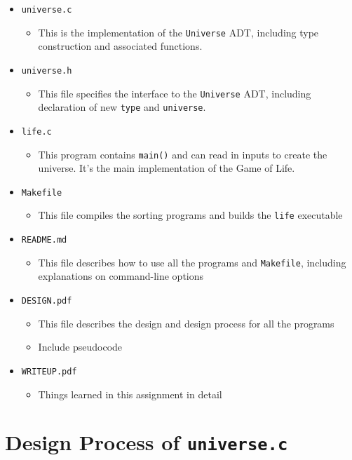 \documentclass[12pt]{article}
\begin{document}
\begin{itemize}
   \item \texttt{universe.c}
   \begin{itemize}
     \item This is the implementation of the \texttt{Universe} ADT, including type construction and associated functions.
   \end{itemize}
   \item \texttt{universe.h}
   \begin{itemize}
     \item This file specifies the interface to the \texttt{Universe} ADT, including declaration of new \texttt{type} and \texttt{universe}.
   \end{itemize}
   \item \texttt{life.c}
   \begin{itemize}
     \item This program contains \texttt{main()} and can read in inputs to create the universe. It's the main implementation of the Game of Life.
   \end{itemize}
   \item \texttt{Makefile}
   \begin{itemize}
     \item This file compiles the sorting programs and builds the \texttt{life} executable
   \end{itemize}
   \item \texttt{README.md}
   \begin{itemize}
     \item This file describes how to use all the programs and \texttt{Makefile}, including explanations on command-line options
   \end{itemize}
   \item \texttt{DESIGN.pdf}
   \begin{itemize}
     \item This file describes the design and design process for all the programs
     \item Include pseudocode
   \end{itemize}
   \item \texttt{WRITEUP.pdf}
   \begin{itemize}
     \item Things learned in this assignment in detail
   \end{itemize}
 \end{itemize}

\section{Design Process of \texttt{universe.c}}
\end{document}
